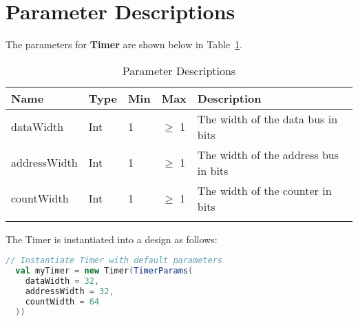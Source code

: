 \section{Parameter Descriptions}

The parameters for \textbf{Timer} are shown below in Table~\ref{table:params}.

\renewcommand*{\arraystretch}{1.4}
\begin{longtable}[H]{
    | p{}
    | p{}
    | p{}
    | p{}
    | p{} |
  }
  \hline
  \textbf{Name} &
  \textbf{Type} &
  \textbf{Min}  &
  \textbf{Max}  &
  \textbf{Description}            \\ \hline \hline

  dataWidth     &
  Int           &
  1             &
  $\ge$ 1       &
  The width of the data bus in bits      \\ \hline

  addressWidth  &
  Int           &
  1             &
  $\ge$ 1       &
  The width of the address bus in bits   \\ \hline

  countWidth    &
  Int           &
  1             &
  $\ge$ 1       &
  The width of the counter in bits       \\ \hline

  \caption{Parameter Descriptions}\label{table:params}
\end{longtable}

The Timer is instantiated into a design as follows:

\begin{lstlisting}[language=Scala]
  // Instantiate Timer with default parameters
  val myTimer = new Timer(TimerParams(
    dataWidth = 32,
    addressWidth = 32,
    countWidth = 64
  ))
\end{lstlisting}